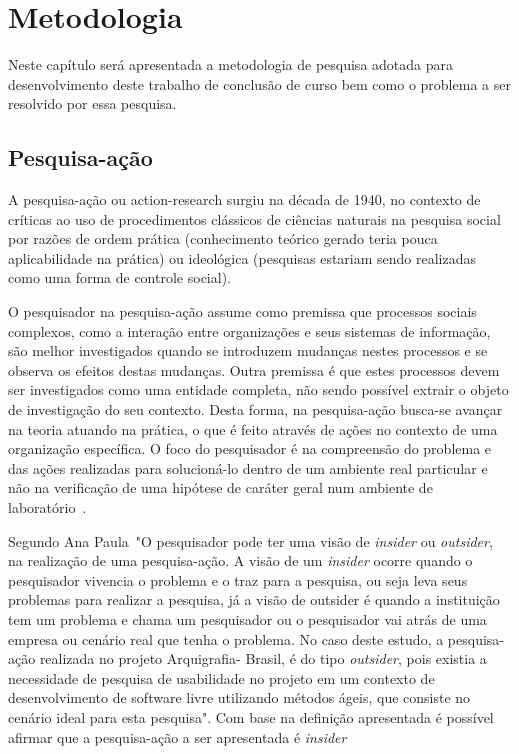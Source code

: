 \chapter{Metodologia}

Neste capítulo será apresentada a metodologia de pesquisa adotada para desenvolvimento 
deste trabalho de conclusão de curso bem como o problema a ser resolvido por essa pesquisa.

\section{Pesquisa-ação}

A pesquisa-ação ou action-research surgiu na década de 1940, no contexto de críticas ao uso
de procedimentos clássicos de ciências naturais na pesquisa social por razões de ordem prática 
(conhecimento teórico gerado teria pouca aplicabilidade na prática) ou ideológica (pesquisas estariam
sendo realizadas como uma forma de controle social)\cite{gil2010metodos}.

O pesquisador na pesquisa-ação
assume como premissa que processos sociais complexos, como a interação
entre organizações e seus sistemas de informação, são melhor investigados
quando se introduzem mudanças nestes processos e se observa os efeitos
destas mudanças. Outra premissa é que estes processos devem ser
investigados como uma entidade completa, não sendo possível extrair o objeto
de investigação do seu contexto. Desta forma, na pesquisa-ação busca-se avançar na teoria 
atuando na prática, o que é feito através de
ações no contexto de uma organização específica. O foco do pesquisador é na
compreensão do problema e das ações realizadas para solucioná-lo dentro de
um ambiente real particular e não na verificação de uma hipótese de caráter
geral num ambiente de laboratório~\cite{fuks2008suporte}.

Segundo Ana Paula~\cite{fuks2008suporte}"O pesquisador pode ter uma visão de \emph{insider}
ou \emph{outsider}, na realização de uma pesquisa-ação.
A visão de um \emph{insider} ocorre quando o pesquisador vivencia o problema e o traz para a pesquisa,
ou seja leva seus problemas para realizar a pesquisa, já a visão de outsider é quando a instituição
tem um problema e chama um pesquisador ou o pesquisador vai atrás de uma empresa ou cenário
real que tenha o problema. No caso deste estudo, a pesquisa-ação realizada no projeto Arquigrafia-
Brasil, é do tipo \emph{outsider}, pois existia a necessidade de pesquisa de usabilidade no projeto em um
contexto de desenvolvimento de software livre utilizando métodos ágeis, que consiste no cenário
ideal para esta pesquisa". Com base na definição apresentada é possível afirmar que a pesquisa-ação a ser 
apresentada é \emph{insider}

